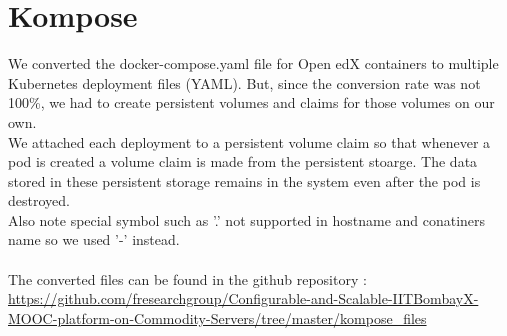 \documentclass[12pt]{report}
\begin{document}
\section{Kompose}
We converted the docker-compose.yaml file for Open edX containers to multiple Kubernetes deployment files (YAML). But, since the conversion rate was not 100\%, we had to create persistent volumes and claims for those volumes on our own.\\
We attached each deployment to a persistent volume claim so that whenever a pod is created a volume claim is made from the persistent stoarge. The data stored in these persistent storage remains in the system even after the pod is destroyed. \\
Also note special symbol such as '.' not supported in hostname and conatiners name so we used '-' instead. \\\\
The converted files can be found in the github repository : \\ \href{https://github.com/fresearchgroup/Configurable-and-Scalable-IITBombayX-MOOC-platform-on-Commodity-Servers/tree/master/kompose_files}{https://github.com/fresearchgroup/Configurable-and-Scalable-IITBombayX-MOOC-platform-on-Commodity-Servers/tree/master/kompose\_files} \cite{Komposefiles}
\end{document}
